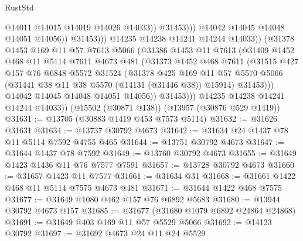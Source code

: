 \begin{lexlean}{RustStd}
\begin{coremodule}
                                    @14011
                                    @14015
                                    @14019
                                    @14026
                                    @14033))
                                @31453)))
                          @14042
                          @14045
                          @14048
                          @14051
                          @14056))
                      @31453)))
                @14235
                @14238
                @14241
                @14244
                @14033))
            (@31378
              @1453
              @169
              @11
              @57
              @7613
              @5066
              (@31386
                @1453
                @11
                @7613
                (@31409
                  @1452
                  @468
                  @11
                  @5114
                  @7611
                  @4673
                  @481
                  (@31373
                    @1452
                    @468
                    @7611
                    (@31515
                      @427
                      @157
                      @76
                      @6848
                      @5572
                      @31524
                      (@31378
                        @425
                        @169
                        @11
                        @57
                        @5570
                        @5066
                        (@31441 @38 @11 @38 @5570 (@14131 (@31446 @38)) @15914)
                        @31453)))
                  @14042
                  @14045
                  @14048
                  @14051
                  @14056))
              @31453)))
        @14235
        @14238
        @14241
        @14244
        @14033))
    (@15502 (@30871 @138))
    (@13957 (@30876 @529 @1419))
@31631 := @13705 (@30883 @1419 @453 @7573 @5114)
@31632 := @31626 @31631
@31634 := @13737 @30792 @4673
@31642 := @31634 @24 @1437 @78 @11 @5114 @7592 @4755 @465
@31644 := @13751 @30792 @4673
@31647 := @31644 @1437 @78 @7592
@31649 := @13760 @30792 @4673
@31655 := @31649 @1423 @1436 @11 @76 @7577 @7591
@31657 := @13728 @30792 @4673
@31660 := @31657 @1423 @11 @7577
@31661 := @31634 @31
@31668 := @31661 @1422 @468 @11 @5114 @7575 @4673 @481
@31671 := @31644 @1422 @468 @7575
@31677 := @31649 @1080 @462 @157 @76 @6892 @5683
@31680 := @13944 @30792 @4673 @157
@31685 := @31677 (@31680 @1079 @6892 @24864 @24868)
@31691 := @31649 @403 @169 @11 @57 @5529 @5066
@31692 := @14123 @30792
@31697 := @31692 @4673 @24 @11 @24 @5529

\end{coremodule}
\end{lexlean}
